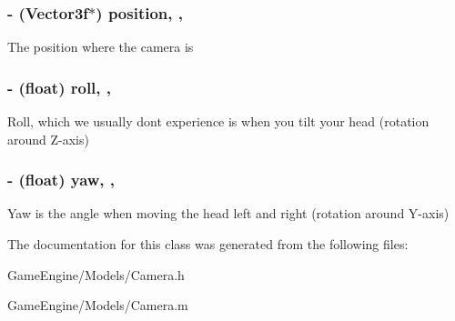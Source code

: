 \subsubsection[{\texorpdfstring{position}{position}}]{\setlength{\rightskip}{0pt plus 5cm}-\/ ({\bf Vector3f}$\ast$) position\hspace{0.3cm}{\ttfamily [read]}, {\ttfamily [atomic]}, {\ttfamily [assign]}}\hypertarget{interface_camera_a59764f8faf1cd481eaa02d504ed088cd}{}\label{interface_camera_a59764f8faf1cd481eaa02d504ed088cd}
The position where the camera is 
\subsubsection[{\texorpdfstring{roll}{roll}}]{\setlength{\rightskip}{0pt plus 5cm}-\/ (float) roll\hspace{0.3cm}{\ttfamily [read]}, {\ttfamily [atomic]}, {\ttfamily [assign]}}\hypertarget{interface_camera_a08d9c6119a859e664d74ca07db4fe3d3}{}\label{interface_camera_a08d9c6119a859e664d74ca07db4fe3d3}
Roll, which we usually don\textquotesingle{}t experience is when you tilt your head (rotation around Z-\/axis) 
\subsubsection[{\texorpdfstring{yaw}{yaw}}]{\setlength{\rightskip}{0pt plus 5cm}-\/ (float) yaw\hspace{0.3cm}{\ttfamily [read]}, {\ttfamily [atomic]}, {\ttfamily [assign]}}\hypertarget{interface_camera_ad76701b22630f2df28a0ae15f0497a3a}{}\label{interface_camera_ad76701b22630f2df28a0ae15f0497a3a}
Yaw is the angle when moving the head left and right (rotation around Y-\/axis) 

The documentation for this class was generated from the following files\+:\begin{DoxyCompactItemize}
\item 
Game\+Engine/\+Models/Camera.\+h\item 
Game\+Engine/\+Models/Camera.\+m\end{DoxyCompactItemize}
